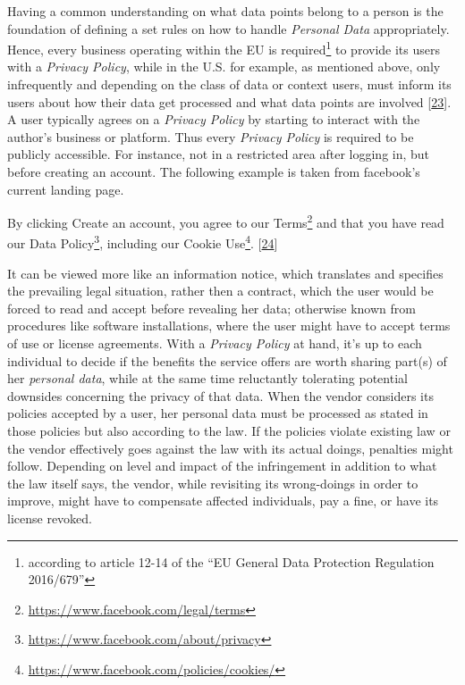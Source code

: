 \documentclass[12pt,english,a4paper,titlepage,cleardoublepage=empty,dottedtoc]{report}
\renewcommand{\href}[2]{#2\footnote{\url{#1}}}
\let\origquote\quote
\let\endorigquote\endquote
\renewenvironment{quote}{%
    \origquote
    \itshape
}
{\endorigquote}
\begin{document}
Having a common understanding on what data points belong to a person is
the foundation of defining a set rules on how to handle \emph{Personal
Data} appropriately. Hence, every business operating within the EU is
required\footnote{according to article 12-14 of the ``EU General Data
  Protection Regulation 2016/679''} to provide its users with a
\emph{Privacy Policy}, while in the U.S. for example, as mentioned
above, only infrequently and depending on the class of data or context
users, must inform its users about how their data get processed and what
data points are involved
{[}\protect\hyperlink{ref-web_2016_privacy-policies-are-mandatory-by-law}{23}{]}.
A user typically agrees on a \emph{Privacy Policy} by starting to
interact with the author's business or platform. Thus every
\emph{Privacy Policy} is required to be publicly accessible. For
instance, not in a restricted area after logging in, but before creating
an account. The following example is taken from facebook's current
landing page.

\begin{quote}
By clicking Create an account, you agree to our
\href{https://www.facebook.com/legal/terms}{Terms} and that you have
read our \href{https://www.facebook.com/about/privacy}{Data Policy},
including our \href{https://www.facebook.com/policies/cookies/}{Cookie
Use}.
{[}\protect\hyperlink{ref-web_2016_facebooks-landing-page_policy-acknowledgement}{24}{]}
\end{quote}

It can be viewed more like an information notice, which translates and
specifies the prevailing legal situation, rather then a contract, which
the user would be forced to read and accept before revealing her data;
otherwise known from procedures like software installations, where the
user might have to accept terms of use or license agreements. With a
\emph{Privacy Policy} at hand, it's up to each individual to decide if
the benefits the service offers are worth sharing part(s) of her
\emph{personal data}, while at the same time reluctantly tolerating
potential downsides concerning the privacy of that data. When the vendor
considers its policies accepted by a user, her personal data must be
processed as stated in those policies but also according to the law. If
the policies violate existing law or the vendor effectively goes against
the law with its actual doings, penalties might follow. Depending on
level and impact of the infringement in addition to what the law itself
says, the vendor, while revisiting its wrong-doings in order to improve,
might have to compensate affected individuals, pay a fine, or have its
license revoked.
\end{document}
